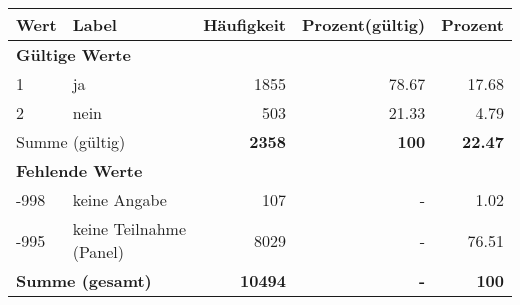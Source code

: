      \begin{longtable}{lXrrr}
     \toprule
     \textbf{Wert} & \textbf{Label} & \textbf{Häufigkeit} & \textbf{Prozent(gültig)} & \textbf{Prozent} \\
     \endhead
     \midrule
     \multicolumn{5}{l}{\textbf{Gültige Werte}}\\

     1 &
     \multicolumn{1}{X}{ ja   } &


       \num{1855} &
       \num[round-mode=places,round-precision=2]{78.67} &
         \num[round-mode=places,round-precision=2]{17.68} \\

     2 &
     \multicolumn{1}{X}{ nein   } &


       \num{503} &
       \num[round-mode=places,round-precision=2]{21.33} &
         \num[round-mode=places,round-precision=2]{4.79} \\
     \midrule
     \multicolumn{2}{l}{Summe (gültig)} &
       \textbf{\num{2358}} &
     \textbf{\num{100}} &
       \textbf{\num[round-mode=places,round-precision=2]{22.47}} \\
     \multicolumn{5}{l}{\textbf{Fehlende Werte}}\\
       -998 &
       keine Angabe &
         \num{107} &
        - &
         \num[round-mode=places,round-precision=2]{1.02} \\
       -995 &
       keine Teilnahme (Panel) &
         \num{8029} &
        - &
         \num[round-mode=places,round-precision=2]{76.51} \\
     \midrule
     \multicolumn{2}{l}{\textbf{Summe (gesamt)}} &
          \textbf{\num{10494}} &
        \textbf{-} &
        \textbf{\num{100}} \\
     \bottomrule
     \end{longtable}
     
